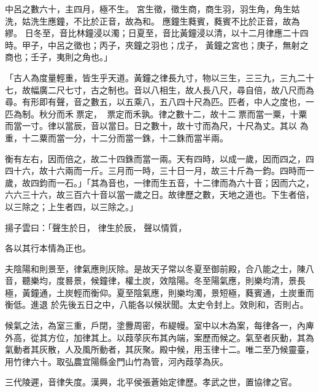 \begin{pinyinscope}
中呂之數六十，主四月，極不生。
 宮生徵，徵生商，商生羽，羽生角，角生姑洗，姑洗生應鐘，不比於正音，故為和。
 應鐘生蕤賓，蕤賓不比於正音，故為繆。
 日冬至，音比林鐘浸以濁；日夏至，音比黃鐘浸以清，以十二月律應二十四時。甲子，中呂之徵也；丙子，夾鐘之羽也；戊子，
 黃鐘之宮也；庚子，無射之商也；壬子，夷則之角也。」


「古人為度量輕重，皆生乎天道。黃鐘之律長九寸，物以三生，三三九，三九二十七，故幅廣二尺七寸，古之制也。音以八相生，故人長八尺，尋自倍，故八尺而為尋。有形即有聲，音之數五，以五乘八，五八四十尺為匹。匹者，中人之度也，一匹為制。秋分而禾票定，
 票定而禾孰。律之數十二，故十二票而當一粟，十粟而當一寸。律以當辰，音以當日。日之數十，故十寸而為尺，十尺為丈。其以
 為重，十二粟而當一分，十二分而當一銖，十二銖而當半兩。



 衡有左右，因而倍之，故二十四銖而當一兩。天有四時，以成一歲，因而四之，四四十六，故十六兩而一斤。三月而一時，三十日一月，故三十斤為一鈞。四時而一歲，故四鈞而一石。」「其為音也，一律而生五音，十二律而為六十音；因而六之，六六三十六，故三百六十音以當一歲之日。故律歷之數，天地之道也。下生者倍，以三除之；上生者四，以三除之。」


揚子雲曰：「聲生於日，
 律生於辰，
 聲以情質，



 各以其行本情為正也。



 夫陰陽和則景至，律氣應則灰除。是故天子常以冬夏至御前殿，合八能之士，陳八音，聽樂均，度晷景，候鐘律，權土炭，效陰陽。冬至陽氣應，則樂均清，景長極，黃鐘通，土炭輕而衡仰。夏至陰氣應，則樂均濁，景短極，蕤賓通，土炭重而衡低。進退
 於先後五日之中，八能各以候狀聞。太史令封上。效則和，否則占。



 候氣之法，為室三重，戶閉，塗釁周密，布緹幔。室中以木為案，每律各一，內庳外高，從其方位，加律其上。以葭莩灰布其內端，案歷而候之。氣至者灰動，其為氣動者其灰散，人及風所動者，其灰聚。殿中候，用玉律十二。唯二至乃候靈臺，用竹律六十。取弘農宜陽縣金門山竹為管，河內葭莩為灰。



 三代陵遲，音律失度。漢興，北平侯張蒼始定律歷。孝武之世，置協律之官。




\end{pinyinscope}
